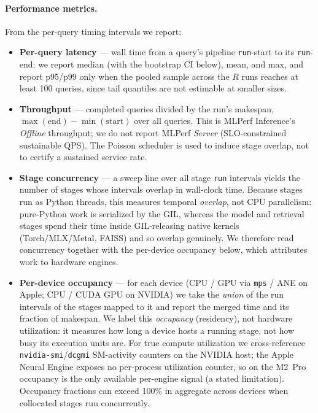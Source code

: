 \paragraph{Performance metrics.} From the per-query timing intervals we report:
\begin{itemize}
  \item \textbf{Per-query latency} --- wall time from a query's pipeline
    \texttt{run}-start to its \texttt{run}-end; we report median (with the
    bootstrap CI below), mean, and max, and report p95/p99 only when the pooled
    sample across the $R$ runs reaches at least \num{100} queries,
    since tail quantiles are not estimable at smaller sizes.
  \item \textbf{Throughput} --- completed queries divided by the run's
    makespan, $\max(\text{end}) - \min(\text{start})$ over all queries. This is
    MLPerf Inference's \emph{Offline} throughput; we do not report MLPerf
    \emph{Server} (SLO-constrained sustainable QPS). The Poisson scheduler is
    used to induce stage overlap, not to certify a sustained service rate.
  \item \textbf{Stage concurrency} --- a sweep line over all stage \texttt{run}
    intervals yields the number of stages whose intervals overlap in
    wall-clock time. Because stages run as Python threads, this measures
    temporal \emph{overlap}, not CPU parallelism: pure-Python work is
    serialized by the GIL, whereas the model and retrieval stages spend their
    time inside GIL-releasing native kernels (Torch/MLX/Metal, FAISS) and so
    overlap genuinely. We therefore read concurrency together with the
    per-device occupancy below, which attributes work to hardware engines.
  \item \textbf{Per-device occupancy} --- for each device (CPU / GPU via
    \texttt{mps} / ANE on Apple; CPU / CUDA GPU on NVIDIA) we take the
    \emph{union} of the run intervals of the stages mapped to it and report the
    merged time and its fraction of makespan. We label this \emph{occupancy}
    (residency), not hardware utilization: it measures how long a device hosts
    a running stage, not how busy its execution units are. For true compute
    utilization we cross-reference \texttt{nvidia-smi}/\texttt{dcgmi}
    SM-activity counters on the NVIDIA host; the Apple Neural Engine exposes no
    per-process utilization counter, so on the M2~Pro occupancy is the only
    available per-engine signal (a stated limitation). Occupancy fractions can
    exceed 100\% in aggregate across devices when collocated stages run
    concurrently.
\end{itemize}

